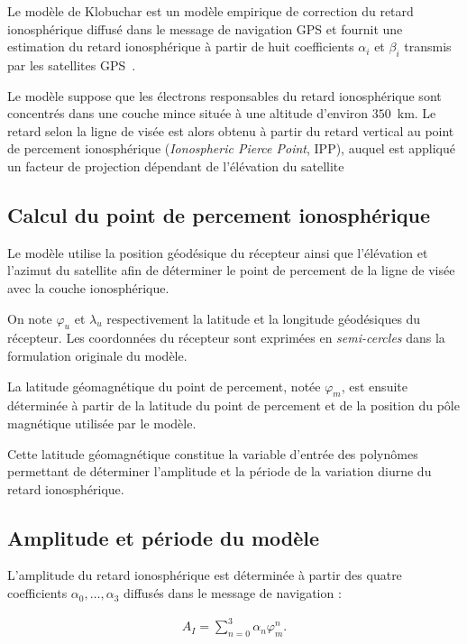 Le modèle de Klobuchar est un modèle empirique de correction du retard
ionosphérique diffusé dans le message de navigation GPS et fournit une estimation
du retard ionosphérique à partir de huit coefficients $\alpha_i$ et
$\beta_i$ transmis par les satellites GPS~\cite{klobuchar1987}.

Le modèle suppose que les électrons responsables du retard ionosphérique sont
concentrés dans une couche mince située à une altitude d'environ $350$~km.
Le retard selon la ligne de visée est alors obtenu à partir du retard
vertical au point de percement ionosphérique (\textit{Ionospheric Pierce
Point}, IPP), auquel est appliqué un facteur de projection dépendant de
l'élévation du satellite

\subsection{Calcul du point de percement ionosphérique}

Le modèle utilise la position géodésique du récepteur ainsi que l'élévation
et l'azimut du satellite afin de déterminer le point de percement de la ligne
de visée avec la couche ionosphérique.

On note $\varphi_u$ et $\lambda_u$ respectivement la latitude et la longitude
géodésiques du récepteur. Les coordonnées du récepteur sont exprimées en
\textit{semi-cercles} dans la formulation originale du modèle.

La latitude géomagnétique du point de percement, notée $\varphi_m$, est
ensuite déterminée à partir de la latitude du point de percement et de la
position du pôle magnétique utilisée par le modèle.

Cette latitude géomagnétique constitue la variable d'entrée des polynômes
permettant de déterminer l'amplitude et la période de la variation
diurne du retard ionosphérique.

\subsection{Amplitude et période du modèle}

L'amplitude du retard ionosphérique est déterminée à partir des quatre
coefficients $\alpha_0,\ldots,\alpha_3$ diffusés dans le message de navigation :

\begin{align}
A_I
=
\sum_{n=0}^{3}\alpha_n\varphi_m^n.
\label{eq:klobuchar_amplitude}
\end{align}

